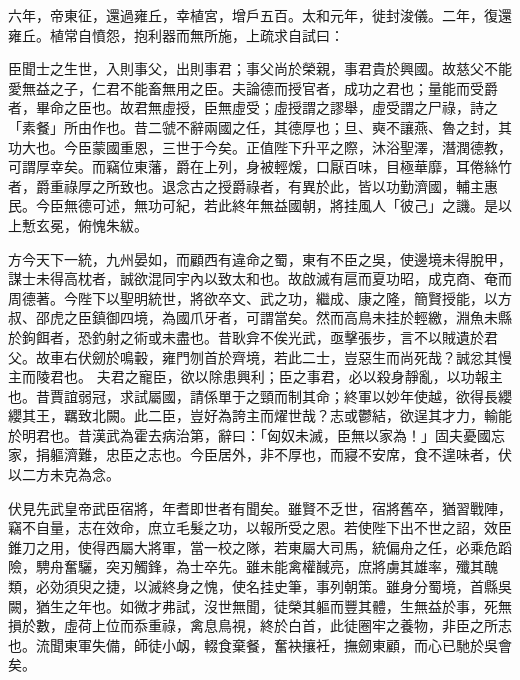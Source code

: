 \begin{pinyinscope}
六年，帝東征，還過雍丘，幸植宮，增戶五百。太和元年，徙封浚儀。二年，復還雍丘。植常自憤怨，抱利器而無所施，上疏求自試曰：


臣聞士之生世，入則事父，出則事君；事父尚於榮親，事君貴於興國。故慈父不能愛無益之子，仁君不能畜無用之臣。夫論德而授官者，成功之君也；量能而受爵者，畢命之臣也。故君無虛授，臣無虛受；虛授謂之謬舉，虛受謂之尸祿，詩之「素餐」所由作也。昔二虢不辭兩國之任，其德厚也；旦、奭不讓燕、魯之封，其功大也。今臣蒙國重恩，三世于今矣。正值陛下升平之際，沐浴聖澤，潛潤德教，可謂厚幸矣。而竊位東藩，爵在上列，身被輕煖，口厭百味，目極華靡，耳倦絲竹者，爵重祿厚之所致也。退念古之授爵祿者，有異於此，皆以功勤濟國，輔主惠民。今臣無德可述，無功可紀，若此終年無益國朝，將挂風人「彼己」之譏。是以上慙玄冕，俯愧朱紱。


方今天下一統，九州晏如，而顧西有違命之蜀，東有不臣之吳，使邊境未得脫甲，謀士未得高枕者，誠欲混同宇內以致太和也。故啟滅有扈而夏功昭，成克商、奄而周德著。今陛下以聖明統世，將欲卒文、武之功，繼成、康之隆，簡賢授能，以方叔、邵虎之臣鎮御四境，為國爪牙者，可謂當矣。然而高鳥未挂於輕繳，淵魚未縣於鉤餌者，恐釣射之術或未盡也。昔耿弇不俟光武，亟擊張步，言不以賊遺於君父。故車右伏劒於鳴轂，雍門刎首於齊境，若此二士，豈惡生而尚死哉？誠忿其慢主而陵君也。
夫君之寵臣，欲以除患興利；臣之事君，必以殺身靜亂，以功報主也。昔賈誼弱冠，求試屬國，請係單于之頸而制其命；終軍以妙年使越，欲得長纓纓其王，羈致北闕。此二臣，豈好為誇主而燿世哉？志或鬱結，欲逞其才力，輸能於明君也。昔漢武為霍去病治第，辭曰：「匈奴未滅，臣無以家為！」固夫憂國忘家，捐軀濟難，忠臣之志也。今臣居外，非不厚也，而寢不安席，食不遑味者，伏以二方未克為念。


伏見先武皇帝武臣宿將，年耆即世者有聞矣。雖賢不乏世，宿將舊卒，猶習戰陣，竊不自量，志在效命，庶立毛髮之功，以報所受之恩。若使陛下出不世之詔，效臣錐刀之用，使得西屬大將軍，當一校之隊，若東屬大司馬，統偏舟之任，必乘危蹈險，騁舟奮驪，突刃觸鋒，為士卒先。雖未能禽權馘亮，庶將虜其雄率，殲其醜類，必効須臾之捷，以滅終身之愧，使名挂史筆，事列朝策。雖身分蜀境，首縣吳闕，猶生之年也。如微才弗試，沒世無聞，徒榮其軀而豐其體，生無益於事，死無損於數，虛荷上位而忝重祿，禽息鳥視，終於白首，此徒圈牢之養物，非臣之所志也。流聞東軍失備，師徒小衂，輟食棄餐，奮袂攘衽，撫劒東顧，而心已馳於吳會矣。



\end{pinyinscope}
